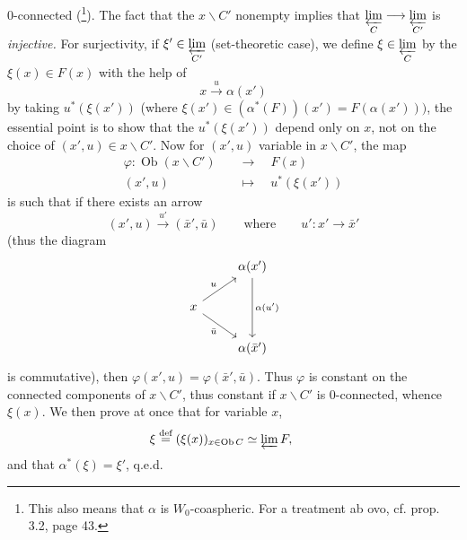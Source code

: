 \documentclass[11pt]{article}
\newcommand{\printedpage}[1]{\marginpar{\footnotesize p.~#1}}
\newcommand{\msp}[1]{\marginpar{\footnotesize [#1]}}
\begin{document}
\printedpage{4}
0-connected (\footnote[4]{This also means that $\alpha$ is $W_0$-coaspheric. For a treatment ab ovo, cf. prop. 3.2, page 43.}). The fact that the $x\backslash C'$ nonempty implies that $\varprojlim\limits_{C} \longrightarrow \varprojlim\limits_{C'}$ is \textit{injective.} For surjectivity, if $\xi' \in \varprojlim\limits_{C'}$ (set-theoretic case), we define $\xi \in \varprojlim\limits_{C}$ by the $\xi(x) \in F(x)$ with the help of %
\msp{page 6}
\[ x \xrightarrow{u} \alpha(x') \]
by taking $u^*(\xi(x'))$ (where $\xi(x') \in (\alpha^*(F))(x') = F(\alpha(x')))$, the essential point is to show that the $u^*(\xi(x'))$ depend only on $x$, not on the choice of $(x',u) \in x\backslash C'$. Now for $(x',u)$ variable in $x\backslash C'$, the map
\[
\begin{aligned}
\varphi : \operatorname{Ob}(x\backslash C') &\quad\longrightarrow\quad F(x)\\
(x',u) &\quad\longmapsto\quad u^*(\xi(x'))
\end{aligned}
\]
is such that if there exists an arrow
\[ (x',u) \xrightarrow{u'} (\bar{x}',\bar{u}) \qquad \text{where} \qquad u' : x' \longrightarrow \bar{x}' \]
(thus the diagram
\[
\begin{tikzcd}
 & \alpha(x') \arrow[dd, "\alpha(u')"] \\
x \arrow[ur, "u"] \arrow[dr, "\bar{u}"'] & \\
 & \alpha(\bar{x}')
\end{tikzcd}
\]
is commutative), then $\varphi(x',u) = \varphi(\bar{x}',\bar{u})$. Thus $\varphi$ is constant on the connected components of $x\backslash C'$, thus constant if $x\backslash C'$ is 0-connected, whence $\xi(x)$. We then prove at once that for variable $x$,
\[ \xi \overset{\text{def}}{=} (\xi(x))_{x\in\operatorname{Ob} C} \simeq \varprojlim F, \qquad \]
and that $\alpha^*(\xi) = \xi'$, q.e.d.
\end{document}
